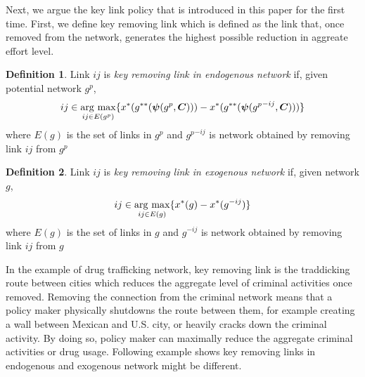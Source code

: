 \documentclass[12pt]{article}
\theoremstyle{definition}
\newtheorem{definition}{Definition}
\newcommand{\bm}[1]{\boldsymbol{#1}}
\newcommand{\argmax}{\mathop{\rm arg~max}\limits}
\begin{document}
Next, we argue the key link policy that is introduced in this paper for the first time.
First, we define key removing link which is defined as the link that, once removed from the network, generates the highest possible reduction in aggreate effort level.

\begin{definition}
	Link $ij$ is {\it{key removing link in endogenous network}} if, given potential network $g^p$,
    \[ ij \in \argmax_{ij \in E(g^p)} \{ x^*(g^{**}(\bm{\psi}(g^p, \bm{C}))) - x^*(g^{**}(\bm{\psi}({g^p}^{-ij}, \bm{C}))) \} \]
    where $E(g)$ is the set of links in $g^p$ and ${g^p}^{-ij}$ is network obtained by removing link $ij$ from $g^p$
\end{definition}

\begin{definition}
	Link $ij$ is {\it{key removing link in exogenous network}} if, given network $g$,
    \[ ij \in \argmax_{ij \in E(g)} \{ x^*(g) - x^*(g^{-ij}) \} \]
    where $E(g)$ is the set of links in $g$ and $g^{-ij}$ is network obtained by removing link $ij$ from $g$
\end{definition}

In the example of drug trafficking network, key removing link is the traddicking route between cities which reduces the aggregate level of criminal activities once removed.
Removing the connection from the criminal network means that a policy maker physically shutdowns the route between them, for example creating a wall between Mexican and U.S. city, or heavily cracks down the criminal activity.
By doing so, policy maker can maximally reduce the aggregate criminal activities or drug usage.
Following example shows key removing links in endogenous and exogenous network might be different.
\end{document}
